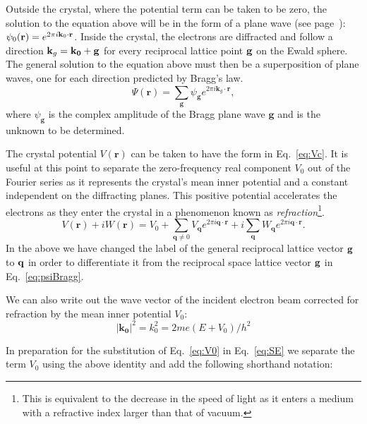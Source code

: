 Outside the crystal, where the potential term can be taken to be zero, the solution to the equation above will be in the form of a plane wave (see page~\pageref{sec:wave}): $\psi_0(\vb{r}) = e^{2\pi i \vb{k}_0 \cdot \vb{r}}$. Inside the crystal, the electrons are diffracted and follow a direction $\vb{k}_g=\mathbf{k_0} + \mathbf{g}$ for every reciprocal lattice point $\vb{g}$ on the Ewald sphere. The general solution to the equation above must then be a superposition of plane waves, one for each direction predicted by Bragg's law. 
\begin{equation}
\label{eq:psiBragg}
    \Psi(\mathbf{r})= \sum_\mathbf{g} \psi_\mathbf{g} e^{2\pi i \mathbf{k}_g  \cdot \mathbf{r}},
\end{equation}
where $\psi_\mathbf{g}$ is the complex amplitude of the Bragg plane wave $\mathbf{g}$ and is the unknown to be determined.


The crystal potential $V(\mathbf{r})$ can be taken to have the form in Eq.~\ref{eq:Vc}. It is useful at this point to separate the zero-frequency real component $V_0$ out of the Fourier series as it represents the crystal's mean inner potential and a constant independent on the diffracting planes. This positive potential accelerates the electrons as they enter the crystal in a phenomenon known as \textit{refraction}\footnote{ This is equivalent to the decrease in the speed of light as it enters a medium with a refractive index larger than that of vacuum.}.
\begin{equation}
\label{eq:V0}
V(\mathbf{r}) + i W(\mathbf{r}) = V_0 + \sum_{\mathbf{q}\neq 0} V_{\mathbf{q}} e^{2 \pi i \mathbf{q} \cdot \mathbf{r}} + i \sum_\mathbf{q} W_{\mathbf{q}} e^{2 \pi i \mathbf{q} \cdot \mathbf{r}}.
\end{equation}
In the above we have changed the label of the general reciprocal lattice vector $\vb{g}$ to $\vb{q}$ in order to differentiate it from the reciprocal space lattice vector $\vb{g}$ in Eq.~\ref{eq:psiBragg}.


We can also  write out the wave vector of the incident electron beam corrected for refraction by the mean inner potential $V_0$:
\begin{equation*}
 |\mathbf{k_0}|^2 = k_0^2  = 2me(E+V_0)/h^2
\end{equation*}

In preparation for the substitution of Eq.~\ref{eq:V0} in Eq.~\ref{eq:SE} we separate the term $V_0$ using the above identity and add the following shorthand notation:

